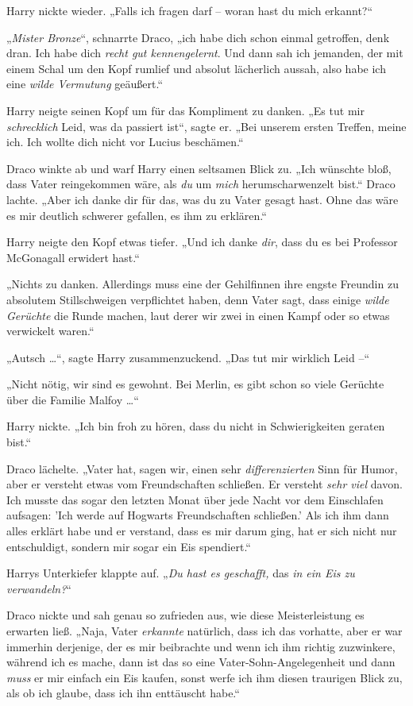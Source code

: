 {Harry nickte wieder. „Falls ich fragen darf -- woran hast du mich erkannt?“

„\emph{Mister Bronze}“, schnarrte Draco, „ich habe dich schon einmal getroffen, denk dran. Ich habe dich \emph{recht gut kennengelernt}. Und dann sah ich jemanden, der mit einem Schal um den Kopf rumlief und absolut lächerlich aussah, also habe ich eine \emph{wilde Vermutung} geäußert.“

Harry neigte seinen Kopf um für das Kompliment zu danken. „Es tut mir \emph{schrecklich} Leid, was da passiert ist“, sagte er. „Bei unserem ersten Treffen, meine ich. Ich wollte dich nicht vor Lucius beschämen.“

Draco winkte ab und warf Harry einen seltsamen Blick zu. „Ich wünschte bloß, dass Vater reingekommen wäre, als \emph{du} um \emph{mich} herumscharwenzelt bist.“ Draco lachte. „Aber ich danke dir für das, was du zu Vater gesagt hast. Ohne das wäre es mir deutlich schwerer gefallen, es ihm zu erklären.“

Harry neigte den Kopf etwas tiefer. „Und ich danke \emph{dir}, dass du es bei Professor McGonagall erwidert hast.“

„Nichts zu danken. Allerdings muss eine der Gehilfinnen ihre engste Freundin zu absolutem Stillschweigen verpflichtet haben, denn Vater sagt, dass einige \emph{wilde Gerüchte} die Runde machen, laut derer wir zwei in einen Kampf oder so etwas verwickelt waren.“

„Autsch …“, sagte Harry zusammenzuckend. „Das tut mir wirklich Leid --“

„Nicht nötig, wir sind es gewohnt. Bei Merlin, es gibt schon so viele Gerüchte über die Familie Malfoy …“

Harry nickte. „Ich bin froh zu hören, dass du nicht in Schwierigkeiten geraten bist.“

Draco lächelte. „Vater hat, sagen wir, einen sehr \emph{differenzierten} Sinn für Humor, aber er versteht etwas vom Freundschaften schließen. Er versteht \emph{sehr viel} davon. Ich musste das sogar den letzten Monat über jede Nacht vor dem Einschlafen aufsagen: 'Ich werde auf Hogwarts Freundschaften schließen.' Als ich ihm dann alles erklärt habe und er verstand, dass es mir darum ging, hat er sich nicht nur entschuldigt, sondern mir sogar ein Eis spendiert.“

Harrys Unterkiefer klappte auf. „\emph{Du hast es geschafft,} das \emph{in ein Eis zu verwandeln?}“

Draco nickte und sah genau so zufrieden aus, wie diese Meisterleistung es erwarten ließ. „Naja, Vater \emph{erkannte} natürlich, dass ich das vorhatte, aber er war immerhin derjenige, der es mir beibrachte und wenn ich ihm richtig zuzwinkere, während ich es mache, dann ist das so eine Vater-Sohn-Angelegenheit und dann \emph{muss} er mir einfach ein Eis kaufen, sonst werfe ich ihm diesen traurigen Blick zu, als ob ich glaube, dass ich ihn enttäuscht habe.“

}
